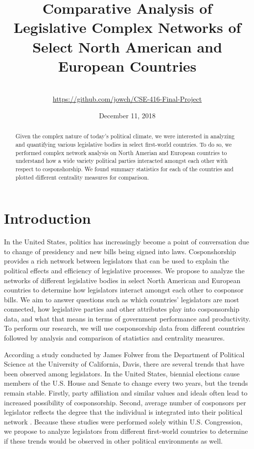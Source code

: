\documentclass[12pt]{article}
\title{Comparative Analysis of Legislative Complex Networks of Select North American and European Countries}
\author{\names \\ \small\url{https://github.com/jowch/CSE-416-Final-Project}}
\date{December 11, 2018}
\begin{document}
\maketitle
\thispagestyle{empty}

\begin{abstract}
    Given the complex nature of today's political climate, we were interested in analyzing and quantifying various legislative bodies in select first-world countries. To do so, we performed complex network analysis on North Amerian and European countries to understand how a wide variety political parties interacted amongst each other with respect to cosponshorship. We found summary statistics for each of the countries and plotted different centrality measures for comparison.
\end{abstract}

\section{Introduction} 

In the United States, politics has increasingly become a point of conversation due to change of presidency and new bills being signed into laws. Cosponshorship provides a rich network between legislators that can be used to explain the political effects and efficiency of legislative processes. We propose to analyze the networks of different legislative bodies in select North American and European countries to determine how legislators interact amongst each other to cosponsor bills. We aim to answer questions such as which countries' legislators are most connected, how legislative parties and other attributes play into cosponsorship data, and what that means in terms of government performance and productivity. To perform our research, we will use cosponsorship data from different countries followed by analysis and comparison of statistics and centrality measures.

According a study conducted by James Folwer from the Department of Political Science at the University of California, Davis, there are several trends that have been observed among legislators. In the United States, biennial elections cause members of the U.S. House and Senate to change every two years, but the trends remain stable. Firstly, party affiliation and similar values and ideals often lead to increased possibility of cosponsorship. Second, average number of cosponsors per legislator reflects the degree that the individual is integrated into their political network \cite{fowler1}. Because these studies were performed solely within U.S. Congression, we propose to analyze legislators from different first-world countries to determine if these trends would be observed in other political environments as well.
 
\end{document}

